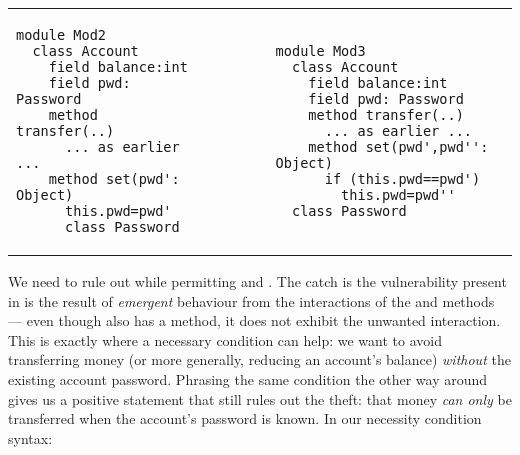   
\begin{tabular}{lll}
\begin{minipage}[b]{0.35\textwidth}
\begin{lstlisting}[language=chainmail, frame=lines]
module Mod2
  class Account
    field balance:int 
    field pwd: Password 
    method transfer(..) 
      ... as earlier ...
    method set(pwd': Object)
      this.pwd=pwd'
      class Password
\end{lstlisting}
\end{minipage}
&\ \ \  \ \   &%
\begin{minipage}[b]{0.50\textwidth}
\begin{lstlisting}[language=chainmail, frame=lines]
module Mod3
  class Account
    field balance:int 
    field pwd: Password 
    method transfer(..) 
      ... as earlier ...
    method set(pwd',pwd'': Object)
      if (this.pwd==pwd') 
        this.pwd=pwd''
  class Password
\end{lstlisting}
\end{minipage} 
\end{tabular}


We need to rule out  while permitting  and
. The catch is the vulnerability present in  is the result
of  \emph{emergent} behaviour from the interactions of the 
and  methods --- even though  also has a
 method, it does not exhibit the unwanted interaction.
This is exactly where a necessary condition can help:
we want to avoid transferring money
(or more generally, reducing an account's balance)
\textit{without} the existing account password.  Phrasing the same condition
the other way around gives us a positive statement that still
rules out the theft: that money \textit{can only} be
transferred when the account's password is known.
In our necessity condition syntax:

